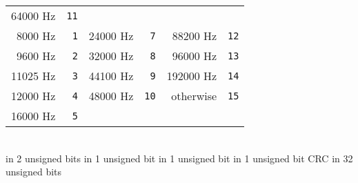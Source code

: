 {\begin{tabular}{rr|rr|rr}
  64000 Hz & \texttt{11} \\
  8000 Hz & \texttt{1} &
  24000 Hz & \texttt{7} &
  88200 Hz & \texttt{12} \\
  9600 Hz & \texttt{2} &
  32000 Hz & \texttt{8} &
  96000 Hz & \texttt{13} \\
  11025 Hz & \texttt{3} &
  44100 Hz & \texttt{9} &
  192000 Hz & \texttt{14} \\
  12000 Hz & \texttt{4} &
  48000 Hz & \texttt{10} &
  otherwise & \texttt{15} \\
  16000 Hz & \texttt{5} \\
\end{tabular} \\
 in 2 unsigned bits
 in 1 unsigned bit
\WRITE \FALSESTEREO in 1 unsigned bit
 in 1 unsigned bit
\WRITE CRC in 32 unsigned bits\;
\EALGORITHM
}
